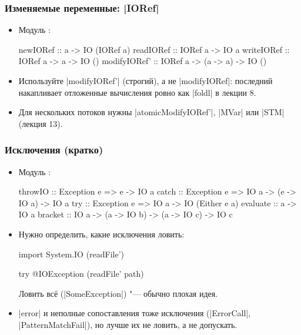 \documentclass[11pt]{beamer}
\begin{document}
\begin{frame}[fragile]
  \frametitle{Изменяемые переменные: \haskinline|IORef|}
  \begin{itemize}
    \item Модуль \href{https://hackage.haskell.org/package/base/docs/Data-IORef.html}{}:
          \begin{haskell}
            newIORef :: a -> IO (IORef a)
            readIORef :: IORef a -> IO a
            writeIORef :: IORef a -> a -> IO ()
            modifyIORef' :: IORef a -> (a -> a) -> IO ()
          \end{haskell}
    \item Используйте \haskinline|modifyIORef'| (строгий), а не \haskinline|modifyIORef|: последний накапливает отложенные вычисления ровно как \haskinline|foldl| в лекции 8.
    \item Для нескольких потоков нужны \haskinline|atomicModifyIORef'|, \haskinline|MVar| или \haskinline|STM| (лекция 13).
  \end{itemize}
\end{frame}

\begin{frame}[fragile]
  \frametitle{Исключения (кратко)}
  \begin{itemize}
    \item Модуль \href{https://hackage.haskell.org/package/base/docs/Control-Exception.html}{}:
          \begin{haskellsmall}
            throwIO :: Exception e => e -> IO a
            catch   :: Exception e => IO a -> (e -> IO a) -> IO a
            try     :: Exception e => IO a -> IO (Either e a)
            evaluate :: a -> IO a
            bracket :: IO a -> (a -> IO b) -> (a -> IO c) -> IO c
          \end{haskellsmall}
    \item Нужно определить, какие исключения ловить:
          \begin{haskellsmall}
            import System.IO (readFile')

            try @IOException (readFile' path)
          \end{haskellsmall}
          Ловить всё (\haskinline|SomeException|) "--- обычно плохая идея.
    \item \haskinline|error| и неполные сопоставления тоже исключения (\haskinline|ErrorCall|, \haskinline|PatternMatchFail|), но лучше их не ловить, а не допускать.
  \end{itemize}
\end{frame}
\end{document}
